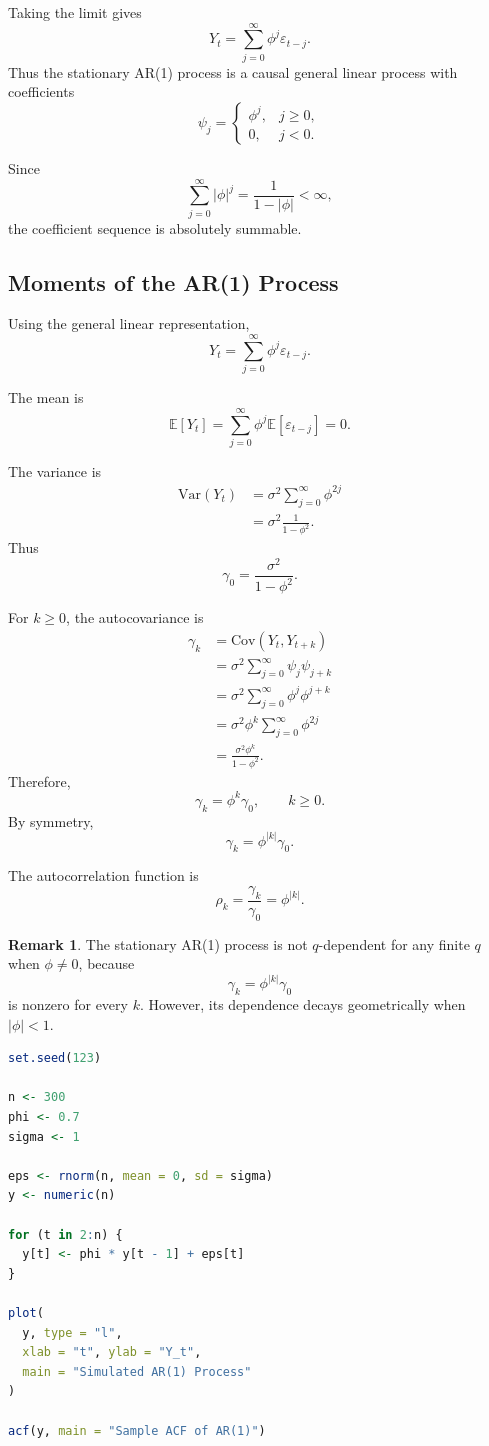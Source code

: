 \documentclass[12pt,oneside]{book}
\numberwithin{equation}{section}
\theoremstyle{definition}
\newtheorem{remark}{Remark}[section]
\theoremstyle{plain}
\theoremstyle{remark}
\newcommand{\E}{\mathbb{E}}
\newcommand{\Var}{\mathrm{Var}}
\newcommand{\Cov}{\mathrm{Cov}}
\begin{document}
Taking the limit gives
\[
Y_t
=
\sum_{j=0}^{\infty}\phi^j\varepsilon_{t-j}.
\]
Thus the stationary AR(1) process is a causal general linear process with coefficients
\[
\psi_j=
\begin{cases}
\phi^j, & j\geq 0,\\
0, & j<0.
\end{cases}
\]

Since
\[
\sum_{j=0}^{\infty}|\phi|^j
=
\frac{1}{1-|\phi|}
<\infty,
\]
the coefficient sequence is absolutely summable.

\subsection{Moments of the AR(1) Process}

Using the general linear representation,
\[
Y_t=\sum_{j=0}^{\infty}\phi^j\varepsilon_{t-j}.
\]

The mean is
\[
\E[Y_t]
=
\sum_{j=0}^{\infty}\phi^j\E[\varepsilon_{t-j}]
=
0.
\]

The variance is
\begin{align*}
\Var(Y_t)
&=
\sigma^2\sum_{j=0}^{\infty}\phi^{2j} \\
&=
\sigma^2\frac{1}{1-\phi^2}.
\end{align*}
Thus
\[
\gamma_0
=
\frac{\sigma^2}{1-\phi^2}.
\]

For $k\geq 0$, the autocovariance is
\begin{align*}
\gamma_k
&=
\Cov(Y_t,Y_{t+k}) \\
&=
\sigma^2\sum_{j=0}^{\infty}\psi_j\psi_{j+k} \\
&=
\sigma^2\sum_{j=0}^{\infty}\phi^j\phi^{j+k} \\
&=
\sigma^2\phi^k\sum_{j=0}^{\infty}\phi^{2j} \\
&=
\frac{\sigma^2\phi^k}{1-\phi^2}.
\end{align*}
Therefore,
\[
\gamma_k=\phi^k\gamma_0,
\qquad
k\geq 0.
\]
By symmetry,
\[
\gamma_k=\phi^{|k|}\gamma_0.
\]

The autocorrelation function is
\[
\rho_k
=
\frac{\gamma_k}{\gamma_0}
=
\phi^{|k|}.
\]

\begin{remark}
The stationary AR(1) process is not $q$-dependent for any finite $q$ when $\phi\neq 0$, because
\[
\gamma_k=\phi^{|k|}\gamma_0
\]
is nonzero for every $k$. However, its dependence decays geometrically when $|\phi|<1$.
\end{remark}

\begin{lstlisting}[language=R, caption={Simulating an AR(1) process in R}]
set.seed(123)

n <- 300
phi <- 0.7
sigma <- 1

eps <- rnorm(n, mean = 0, sd = sigma)
y <- numeric(n)

for (t in 2:n) {
  y[t] <- phi * y[t - 1] + eps[t]
}

plot(
  y, type = "l",
  xlab = "t", ylab = "Y_t",
  main = "Simulated AR(1) Process"
)

acf(y, main = "Sample ACF of AR(1)")
\end{lstlisting}
\end{document}

